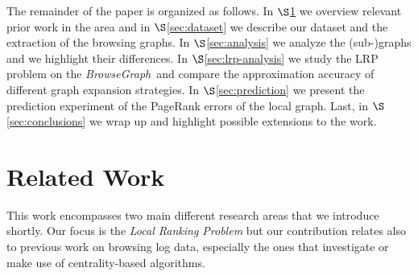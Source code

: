 \documentclass{sig-alternate-2013}
\newcommand{\bgraph}{\textit{BrowseGraph}}
\begin{document}
The remainder of the paper is organized as follows. In $\S$\ref{sec:relatedwork} we overview relevant prior work in the area and in $\S$\ref{sec:dataset} we describe our dataset and the extraction of the browsing graphs. In $\S$\ref{sec:analysis} we analyze the (sub-)graphs and we highlight their differences. In $\S$\ref{sec:lrp-analysis} we study the LRP problem on the \bgraph\ and compare the approximation accuracy of different graph expansion strategies. 
In $\S$\ref{sec:prediction} we present the prediction experiment of the PageRank errors of the local graph. Last, in $\S$\ref{sec:conclusions} we wrap up and highlight possible extensions to the work.


\section{Related Work} \label{sec:relatedwork} 
This work encompasses two main different research areas that we introduce shortly. Our focus is the {\it Local Ranking Problem} but our contribution relates also to previous work on browsing log data, especially the ones that investigate or make use of centrality-based algorithms.

\end{document}
